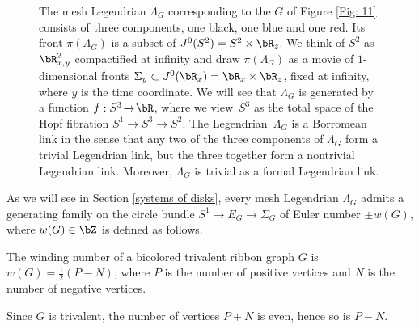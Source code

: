 \begin{figure}[htbp]
\begin{center}
\caption{\smaller The mesh Legendrian $\Lambda_G$ corresponding to the $G$ of Figure \ref{Fig: 11} consists of three components, one black, one blue and one red. Its front $\pi(\Lambda_G)$ is a subset of $J^0(S^2)=S^2 \times \bR_z$. We think of $S^2$ as $\bR^2_{x,y}$ compactified at infinity and draw $\pi(\Lambda_G)$ as a movie of $1$-dimensional fronts $\Sigma_y \subset J^0(\bR_x)=\bR_x \times \bR_z$, fixed at infinity, where $y$ is the time coordinate. We will see that $\Lambda_G$ is generated by a function $f:S^3\!\to\!\bR$, where we view~$S^3$ as the total space of the Hopf fibration $S^1\!\to\!S^3\!\to\!S^2$. The Legendrian~$\Lambda_G$ is a Borromean link in the sense that any two of the three components of $\Lambda_G$ form a trivial Legendrian link, but the three together form a nontrivial Legendrian link. Moreover, $\Lambda_G$ is trivial as a formal Legendrian link.}
\label{Fig: start}
\end{center}
\end{figure}
%

As we will see in Section \ref{systems of disks}, every mesh Legendrian $\Lambda_G$ admits a generating family on the circle bundle $S^1 \to E_G \to \Sigma_G $ of Euler number $\pm w(G)$, where $w(G) \in \bZ$ is defined as follows.

\begin{definition}
The winding number of a bicolored trivalent ribbon graph $G$ is $w(G) = \frac{1}{2}(P-N)$, where $P$ is the number of positive vertices and $N$ is the number of negative vertices.
\end{definition}

\begin{remark}
Since $G$ is trivalent, the number of vertices $P+N$ is even, hence so is $P - N$.
\end{remark}

